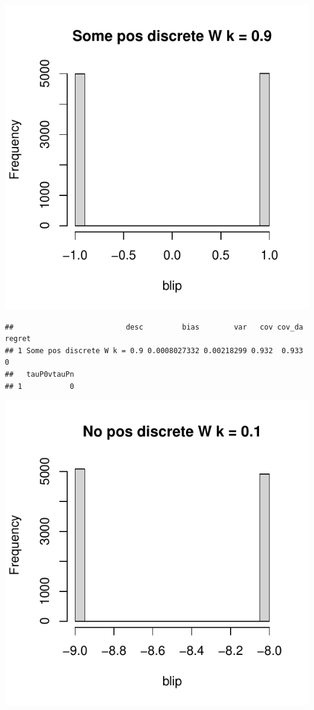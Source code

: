 \documentclass[11pt]{article}\usepackage[]{graphicx}\usepackage[table]{xcolor}
\makeatletter
\def\maxwidth{ %
  \ifdim\Gin@nat@width>\linewidth
    \linewidth
  \else
    \Gin@nat@width
  \fi
}
\newenvironment{kframe}{%
 \def\at@end@of@kframe{}%
 \ifinner\ifhmode%
  \def\at@end@of@kframe{\end{minipage}}%
  \begin{minipage}{\columnwidth}%
 \fi\fi%
 \def\FrameCommand##1{\hskip\@totalleftmargin \hskip-\fboxsep
 \colorbox{shadecolor}{##1}\hskip-\fboxsep
     \hskip-\linewidth \hskip-\@totalleftmargin \hskip\columnwidth}%
 \MakeFramed {\advance\hsize-\width
   \@totalleftmargin\z@ \linewidth\hsize
   \@setminipage}}%
 {\par\unskip\endMakeFramed%
 \at@end@of@kframe}
\newenvironment{knitrout}{}{} %
\makeatother
\begin{document}
\begin{knitrout}
\includegraphics[width=\maxwidth]{figure/unnamed-chunk-4-4} 
\begin{kframe}\begin{verbatim}
##                          desc         bias        var   cov cov_da regret
## 1 Some pos discrete W k = 0.9 0.0008027332 0.00218299 0.932  0.933      0
##   tauP0vtauPn
## 1           0
\end{verbatim}
\end{kframe}
\includegraphics[width=\maxwidth]{figure/unnamed-chunk-4-5} 

\end{knitrout}
\end{document}
